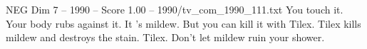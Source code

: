 \begin{textsample}{NEG Dim 7 – 1990 – Score 1.00 – 1990/tv\_com\_1990\_111.txt}  \label{ex:f7_neg_035}
You touch it.
Your body rubs against it.
It 's mildew.
But you can kill it with Tilex.
Tilex kills mildew and destroys the stain.
Tilex.
Don't let mildew ruin your shower.

\end{textsample}
